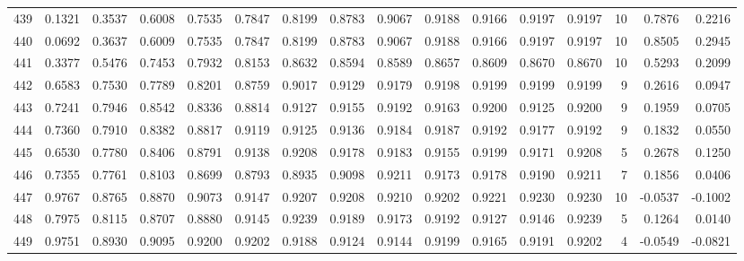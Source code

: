 \begin{tabular}{lrrrrrrrrrrrrrrr}
439 &      0.1321 &  0.3537 &  0.6008 &  0.7535 &  0.7847 &  0.8199 &  0.8783 &  0.9067 &  0.9188 &  0.9166 &   0.9197 &     0.9197 &     10 &                    0.7876 &                     0.2216 \\
440 &      0.0692 &  0.3637 &  0.6009 &  0.7535 &  0.7847 &  0.8199 &  0.8783 &  0.9067 &  0.9188 &  0.9166 &   0.9197 &     0.9197 &     10 &                    0.8505 &                     0.2945 \\
441 &      0.3377 &  0.5476 &  0.7453 &  0.7932 &  0.8153 &  0.8632 &  0.8594 &  0.8589 &  0.8657 &  0.8609 &   0.8670 &     0.8670 &     10 &                    0.5293 &                     0.2099 \\
442 &      0.6583 &  0.7530 &  0.7789 &  0.8201 &  0.8759 &  0.9017 &  0.9129 &  0.9179 &  0.9198 &  0.9199 &   0.9199 &     0.9199 &      9 &                    0.2616 &                     0.0947 \\
443 &      0.7241 &  0.7946 &  0.8542 &  0.8336 &  0.8814 &  0.9127 &  0.9155 &  0.9192 &  0.9163 &  0.9200 &   0.9125 &     0.9200 &      9 &                    0.1959 &                     0.0705 \\
444 &      0.7360 &  0.7910 &  0.8382 &  0.8817 &  0.9119 &  0.9125 &  0.9136 &  0.9184 &  0.9187 &  0.9192 &   0.9177 &     0.9192 &      9 &                    0.1832 &                     0.0550 \\
445 &      0.6530 &  0.7780 &  0.8406 &  0.8791 &  0.9138 &  0.9208 &  0.9178 &  0.9183 &  0.9155 &  0.9199 &   0.9171 &     0.9208 &      5 &                    0.2678 &                     0.1250 \\
446 &      0.7355 &  0.7761 &  0.8103 &  0.8699 &  0.8793 &  0.8935 &  0.9098 &  0.9211 &  0.9173 &  0.9178 &   0.9190 &     0.9211 &      7 &                    0.1856 &                     0.0406 \\
447 &      0.9767 &  0.8765 &  0.8870 &  0.9073 &  0.9147 &  0.9207 &  0.9208 &  0.9210 &  0.9202 &  0.9221 &   0.9230 &     0.9230 &     10 &                   -0.0537 &                    -0.1002 \\
448 &      0.7975 &  0.8115 &  0.8707 &  0.8880 &  0.9145 &  0.9239 &  0.9189 &  0.9173 &  0.9192 &  0.9127 &   0.9146 &     0.9239 &      5 &                    0.1264 &                     0.0140 \\
449 &      0.9751 &  0.8930 &  0.9095 &  0.9200 &  0.9202 &  0.9188 &  0.9124 &  0.9144 &  0.9199 &  0.9165 &   0.9191 &     0.9202 &      4 &                   -0.0549 &                    -0.0821 \\

\end{tabular}

